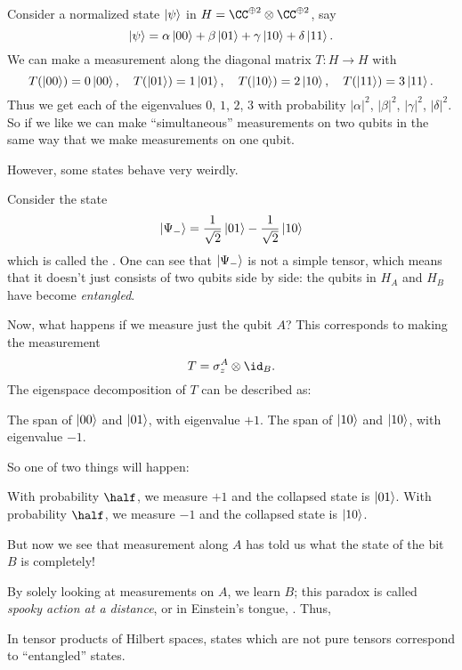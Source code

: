 \documentclass[11pt]{scrreprt}
\begin{document}
\begin{example}
	\label{ex:simult_measurement}
	Consider a normalized state $\ket\psi$ in
	$H = \CC^{\oplus 2} \otimes \CC^{\oplus 2}$, say
	\[ \ket\psi = \alpha\ket{00} + \beta\ket{01}
		+ \gamma\ket{10} + \delta\ket{11}. \]
	We can make a measurement along the diagonal matrix
	$T : H \to H$ with 
	\[ T(\ket{00}) = 0\ket{00}, \quad
	T(\ket{01}) = 1\ket{01}, \quad
	T(\ket{10}) = 2\ket{10}, \quad
	T(\ket{11}) = 3\ket{11}. \]
	Thus we get each of the eigenvalues $0$, $1$, $2$, $3$
	with probability $|\alpha|^2$, $|\beta|^2$, $|\gamma|^2$, $|\delta|^2$.
	So if we like we can make ``simultaneous'' measurements on two qubits
	in the same way that we make measurements on one qubit.
\end{example}

However, some states behave very weirdly.
\begin{example}
	Consider the state
	\[
		\ket{\Psi_-}
		=
		\frac{1}{\sqrt2} \ket{01}
		- \frac{1}{\sqrt2} \ket{10}
	\]
	which is called the .
	One can see that $\ket{\Psi_-}$ is not a simple tensor,
	which means that it doesn't just consists of two qubits side by side:
	the qubits in $H_A$ and $H_B$ have become \emph{entangled}.

	Now, what happens if we measure just the qubit $A$?
	This corresponds to making the measurement
	\[ T = \sigma_z^A \otimes \id_B. \]
	The eigenspace decomposition of $T$ can be described as:
	\begin{itemize}
		\ii The span of $\ket{00}$ and $\ket{01}$, with eigenvalue $+1$.
		\ii The span of $\ket{10}$ and $\ket{10}$, with eigenvalue $-1$.
	\end{itemize}
	So one of two things will happen:
	\begin{itemize}
		\ii With probability $\half$, we measure $+1$
		and the collapsed state is $\ket{01}$.
		\ii With probability $\half$, we measure $-1$
		and the collapsed state is $\ket{10}$.
	\end{itemize}
	But now we see that measurement along $A$ has told us what the
	state of the bit $B$ is completely!
\end{example}
By solely looking at measurements on $A$, we learn $B$;
this paradox is called \emph{spooky action at a distance},
or in Einstein's tongue, .  
Thus,
\begin{moral}
	In tensor products of Hilbert spaces,
	states which are not pure tensors
	correspond to ``entangled'' states.
\end{moral}
\end{document}
